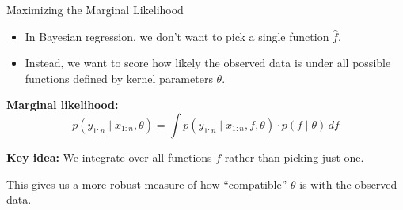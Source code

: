 \documentclass[handout,aspectratio=169]{beamer}
\begin{document}
\begin{frame}{Maximizing the Marginal Likelihood}
\vspace{-0.2cm}
\begin{itemize}
    \item In Bayesian regression, we don’t want to pick a single function $\hat{f}$.
    \item Instead, we want to score how likely the observed data is under all possible functions defined by kernel parameters $\theta$.
\end{itemize}

\vspace{0.3cm}
\textbf{Marginal likelihood:}
\[
p(y_{1:n} \mid x_{1:n}, \theta) = \int p(y_{1:n} \mid x_{1:n}, f, \theta) \cdot p(f \mid \theta) \, df \tag{4.26}
\]

\pause
\vspace{0.2cm}
\textbf{Key idea:} We integrate over all functions $f$ rather than picking just one.

\vspace{0.3cm}
This gives us a more robust measure of how “compatible” $\theta$ is with the observed data.
\end{frame}
\end{document}
